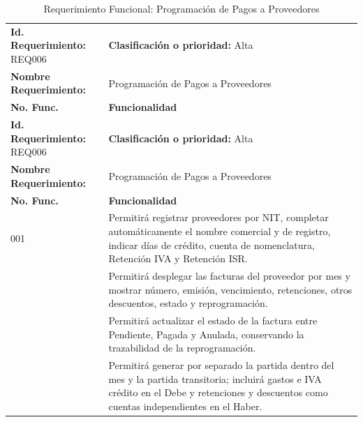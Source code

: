 {
\small
{}
\setlength{\parindent}{0pt}
\begin{xltabular}{\linewidth}{
    >{\raggedright\arraybackslash}p{4.2cm} 
    >{\raggedright\arraybackslash}X
}

    \caption{Requerimiento Funcional: Programación de Pagos a Proveedores} \label{tab:req006_proveedores} \\
    \toprule
    \textbf{Id. Requerimiento:} REQ006 & \textbf{Clasificación o prioridad:} Alta \\
    \textbf{Nombre Requerimiento:} & Programación de Pagos a Proveedores \\
    \textbf{No. Func.} & \textbf{Funcionalidad} \\
    \midrule
    \endfirsthead

    \toprule
    \textbf{Id. Requerimiento:} REQ006 & \textbf{Clasificación o prioridad:} Alta \\
    \textbf{Nombre Requerimiento:} & Programación de Pagos a Proveedores \\
    \textbf{No. Func.} & \textbf{Funcionalidad} \\
    \midrule
    \endhead

    \endfoot

    \bottomrule
\endlastfoot

    001 & Permitirá registrar proveedores por NIT, completar automáticamente el nombre comercial y de registro, indicar días de crédito, cuenta de nomenclatura, Retención IVA y Retención ISR. \\
     & Permitirá desplegar las facturas del proveedor por mes y mostrar número, emisión, vencimiento, retenciones, otros descuentos, estado y reprogramación. \\
     & Permitirá actualizar el estado de la factura entre Pendiente, Pagada y Anulada, conservando la trazabilidad de la reprogramación. \\
     & Permitirá generar por separado la partida dentro del mes y la partida transitoria; incluirá gastos e IVA crédito en el Debe y retenciones y descuentos como cuentas independientes en el Haber. \\
\end{xltabular}
}

